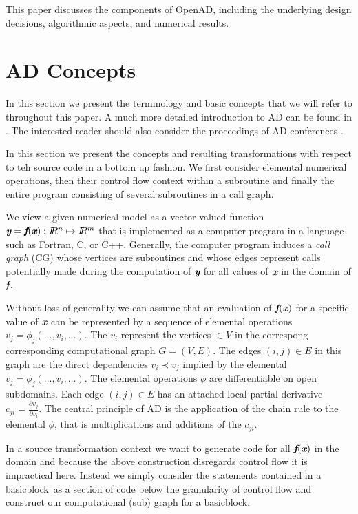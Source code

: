 \documentclass[11pt]{article}
\newcommand{\basicblock}{basicblock}
\newcommand{\OpenAD}{OpenAD}
\newcommand{\R}{I\!\!R}
\newcommand{\bmf}{\mbox{\bf\em f}}
\newcommand{\bmx}{\mbox{\bf\em x}}
\newcommand{\bmy}{\mbox{\bf\em y}}
\begin{document}
This paper discusses the components of \OpenAD,
including the underlying design decisions, algorithmic aspects, and
numerical results.
 
\section{AD Concepts}\label{sec:ADIntro}

In this section we present the terminology and basic concepts that 
we will refer to throughout 
this paper. 
A much more detailed introduction to AD can be found in \cite{Gri00}.
The interested reader should also consider the proceedings of AD 
conferences \cite{CG91,BBCG96,CFG+01,BCH+05}.

In this section we present the concepts and resulting transformations 
with respect to teh source code 
in a bottom up fashion.  
We first consider elemental numerical operations, 
then their control flow context within a subroutine and finally the entire program 
consisting of several subroutines in a call graph. 

We view a given numerical model as a 
vector valued function $\bmy=\bmf(\bmx): \R^n\mapsto \R^m$ that is implemented 
as a computer program in a language such as Fortran, C, or C++. 
Generally, the computer program 
induces a {\em call graph} (CG) \cite{ASU86}
whose vertices are subroutines and whose edges 
represent calls potentially made during the computation of $\bmy$ for all 
values of $\bmx$ in the domain of $\bmf$. 

Without loss of generality we can assume that an evaluation of $\bmf(\bmx)$ for  
a specific value of $\bmx$ can be represented by a sequence of 
elemental operations $v_j=\phi_j(\ldots,v_i,\ldots)$. 
The $v_i$ represent the vertices $\in V$ in the correspong corresponding computational 
graph $G=(V,E)$. The edges $(i,j)\in E$ in this graph are the direct dependencies 
$v_i\prec v_j$ implied by the elemental $v_j=\phi_j(\ldots,v_i,\ldots)$.
The elemental operations $\phi$ are differentiable on open subdomains. 
Each edge $(i,j)\in E$ has an attached local partial derivative 
$c_{ji}=\frac{\partial v_j}{\partial v_i}$. 
The central principle of AD is 
the application of the chain rule to the elemental $\phi$, that is 
multiplications and additions of the  $c_{ji}$.  

In a source transformation context we want to generate code for all $\bmf(\bmx)$
in the domain and because the above construction disregards control flow it is 
impractical here. Instead we simply consider the statements contained in a 
\basicblock\  as a section of code below the granularity of control flow and 
construct our computational (sub) graph for a \basicblock.   
\end{document}
